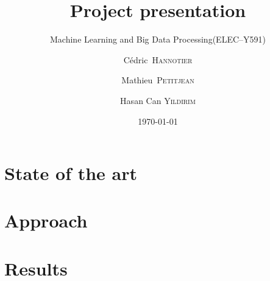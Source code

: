 \documentclass[english,10pt]{beamer}
\title[ELEC--Y591]{Project presentation}
\subtitle{\texorpdfstring{Machine Learning and Big Data Processing(\textsc{ELEC--Y591})}{(ELEC--Y591)}}
\author[Bruface]{Cédric~\textsc{Hannotier} \and Mathieu~\textsc{Petitjean} \and Hasan Can \textsc{Yildirim}}
\date{\today}
\begin{document}
\begin{frame}
  \titlepage
\end{frame}

\section[]{State of the art}


\section[]{Approach}


\section[]{Results}

\end{document}
